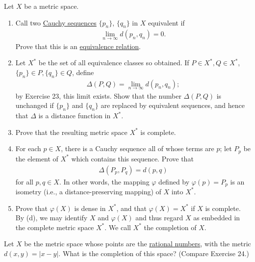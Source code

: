   \begin{exercise}[Rudin 3.24]
    Let $X$ be a metric space.
    \begin{enumerate} 
      \item[(a)] Call two \hyperref[def:cauchy-sequence]{Cauchy sequences} $\{p_n\}$, $\{q_n\}$ in $X$ equivalent if
      \begin{align*}
        \lim_{n \to \infty} d(p_n, q_n) = 0.
      \end{align*}
      Prove that this is an \hyperref[st-def:equivalence_relation]{equivalence relation}.
      \item[(b)] Let $X^*$ be the set of all equivalence classes so obtained. If $P \in X^*, Q \in X^*$, $\{p_n\} \in P, \{q_n\} \in Q$, define
      \begin{align*}
        \Delta(P, Q) = \lim_{n \to \infty} d(p_n, q_n);
      \end{align*}
      by Exercise 23, this limit exists. Show that the number $\Delta(P, Q)$ is unchanged if $\{p_n\}$ and $\{q_n\}$ are replaced by equivalent sequences, and hence that $\Delta$ is a distance function in $X^*$.
      \item[(c)] Prove that the resulting metric space $X^*$ is complete.
      \item[(d)] For each $p \in X$, there is a Cauchy sequence all of whose terms are $p$; let $P_p$ be the element of $X^*$ which contains this sequence. Prove that
      \begin{align*}
        \Delta(P_p, P_q) = d(p, q)
      \end{align*}
      for all $p, q \in X$. In other words, the mapping $\varphi$ defined by $\varphi(p) = P_p$ is an isometry (i.e., a distance-preserving mapping) of $X$ into $X^*$.
      \item[(e)] Prove that $\varphi(X)$ is dense in $X^*$, and that $\varphi(X) = X^*$ if $X$ is complete. By (d), we may identify $X$ and $\varphi(X)$ and thus regard $X$ as embedded in the complete metric space $X^*$. We call $X^*$ the completion of $X$.
    \end{enumerate}
  \end{exercise}
  \begin{solution}
    
  \end{solution}

  \begin{exercise}[Rudin 3.25]
    Let $X$ be the metric space whose points are the \hyperref[alg-def:rational-numbers]{rational numbers}, with the metric $d(x, y) = |x - y|$. What is the completion of this space? (Compare Exercise 24.)
  \end{exercise}
  \begin{solution}
    
  \end{solution}


